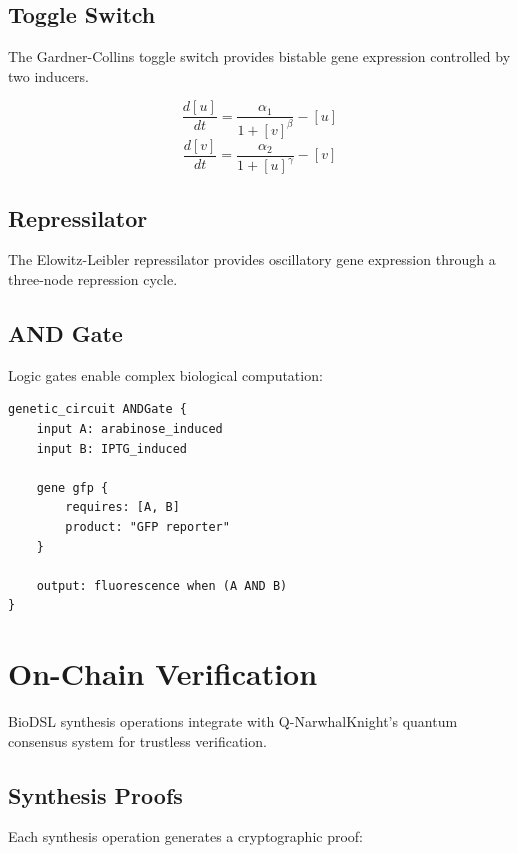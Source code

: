 \documentclass[12pt,a4paper]{article}
\begin{document}
\subsection{Toggle Switch}

The Gardner-Collins toggle switch provides bistable gene expression controlled by two inducers.

\begin{equation}
\frac{d[u]}{dt} = \frac{\alpha_1}{1 + [v]^{\beta}} - [u]
\end{equation}
\begin{equation}
\frac{d[v]}{dt} = \frac{\alpha_2}{1 + [u]^{\gamma}} - [v]
\end{equation}

\subsection{Repressilator}

The Elowitz-Leibler repressilator provides oscillatory gene expression through a three-node repression cycle.

\subsection{AND Gate}

Logic gates enable complex biological computation:

\begin{lstlisting}[style=biodsl,caption={BioDSL AND gate implementation}]
genetic_circuit ANDGate {
    input A: arabinose_induced
    input B: IPTG_induced

    gene gfp {
        requires: [A, B]
        product: "GFP reporter"
    }

    output: fluorescence when (A AND B)
}
\end{lstlisting}

\section{On-Chain Verification}

BioDSL synthesis operations integrate with Q-NarwhalKnight's quantum consensus system for trustless verification.

\subsection{Synthesis Proofs}

Each synthesis operation generates a cryptographic proof:
\end{document}
